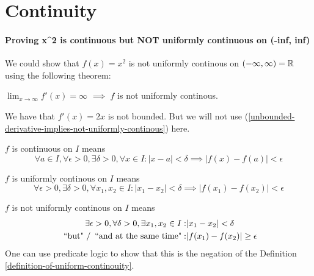 \chapter{Continuity}
\subsubsection*{Proving x^{}2 is continuous but NOT uniformly continuous on (-inf, inf)}
We could show that $f(x)=x^2$ is not uniformly continous on $(-\infty, \infty) = \mathbb{R}$ using the following theorem:

\begin{thm}
	\label{unbounded-derivative-implies-not-uniformly-continous}
	$\lim_{x \to \infty} f'(x) = \infty$ $\implies$ $f$ is not uniformly continous.
\end{thm}
We have that $f'(x)=2x$ is not bounded. But we will not use (\ref{unbounded-derivative-implies-not-uniformly-continous}) here.

\begin{mydef}
	\label{definition-of-continouity}
	$f$ is continuous on $I$ means 
	\begin{equation}
		\forall a \in I, \forall \epsilon > 0, \exists \delta > 0, \forall x \in I : | x-a | < \delta \implies |f(x) - f(a)| < \epsilon
	\end{equation}
\end{mydef}

\begin{mydef}
	\label{definition-of-uniform-continouity}
	$f$ is uniformly continous on $I$ means 
	\begin{equation}
		\forall \epsilon > 0, \exists \delta > 0, \forall x_1, x_2 \in I: |x_1-x_2| < \delta \implies |f(x_1) - f(x_2)| < \epsilon
	\end{equation}
\end{mydef}

\begin{mydef}
	\label{definition-of-non-uniform-continouity}
	$f$ is not uniformly continous on $I$ means
	\begin{equation}
		\label{equation-of-non-uniform-continouity}
		\begin{aligned}
			\exists \epsilon > 0, \forall \delta > 0, \exists x_1, x_2 \in I:
			&|x_1 - x_2| < \delta \\
			\text{ ``but" \slash $\,$ ``and at the same time"}: 
			& |f(x_1)- f(x_2)| \geq \epsilon
		\end{aligned}
	\end{equation}
One can use predicate logic to show that this is the negation of the Definition \ref{definition-of-uniform-continouity}.
\end{mydef}

